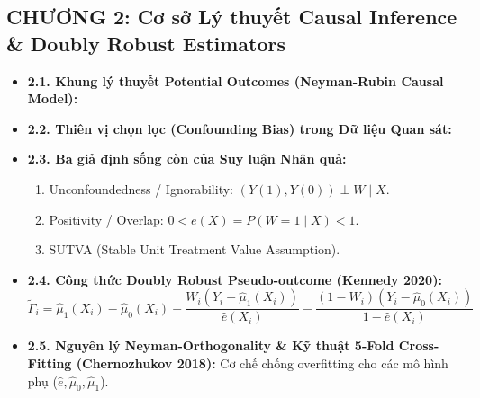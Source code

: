 \subsection*{CHƯƠNG 2: Cơ sở Lý thuyết Causal Inference \& Doubly Robust Estimators}
\begin{itemize}[leftmargin=*]
    \item \textbf{2.1. Khung lý thuyết Potential Outcomes (Neyman-Rubin Causal Model):}
    \item \textbf{2.2. Thiên vị chọn lọc (Confounding Bias) trong Dữ liệu Quan sát:}
    \item \textbf{2.3. Ba giả định sống còn của Suy luận Nhân quả:}
    \begin{enumerate}
        \item Unconfoundedness / Ignorability: $(Y(1), Y(0)) \perp W \mid X$.
        \item Positivity / Overlap: $0 < e(X) = P(W=1 \mid X) < 1$.
        \item SUTVA (Stable Unit Treatment Value Assumption).
    \end{enumerate}
    \item \textbf{2.4. Công thức Doubly Robust Pseudo-outcome (Kennedy 2020):}
    \begin{equation*}
        \tilde{\Gamma}_i = \hat{\mu}_1(X_i) - \hat{\mu}_0(X_i) + \frac{W_i (Y_i - \hat{\mu}_1(X_i))}{\hat{e}(X_i)} - \frac{(1-W_i)(Y_i - \hat{\mu}_0(X_i))}{1 - \hat{e}(X_i)}
    \end{equation*}
    \item \textbf{2.5. Nguyên lý Neyman-Orthogonality \& Kỹ thuật 5-Fold Cross-Fitting (Chernozhukov 2018):} Cơ chế chống overfitting cho các mô hình phụ ($\hat{e}, \hat{\mu}_0, \hat{\mu}_1$).
\end{itemize}

